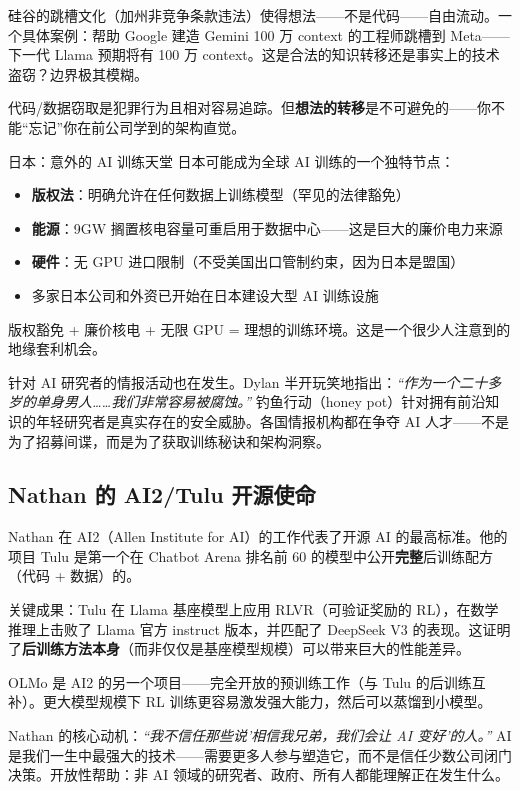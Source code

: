 \documentclass[a4paper]{article}
\begin{document}
硅谷的跳槽文化（加州非竞争条款违法）使得想法——不是代码——自由流动。一个具体案例：帮助 Google 建造 Gemini 100 万 context 的工程师跳槽到 Meta——下一代 Llama 预期将有 100 万 context。这是合法的知识转移还是事实上的技术盗窃？边界极其模糊。

代码/数据窃取是犯罪行为且相对容易追踪。但\textbf{想法的转移}是不可避免的——你不能``忘记''你在前公司学到的架构直觉。

\begin{knowledgebox}{日本：意外的 AI 训练天堂}
日本可能成为全球 AI 训练的一个独特节点：
\begin{itemize}
    \item \textbf{版权法}：明确允许在任何数据上训练模型（罕见的法律豁免）
    \item \textbf{能源}：9GW 搁置核电容量可重启用于数据中心——这是巨大的廉价电力来源
    \item \textbf{硬件}：无 GPU 进口限制（不受美国出口管制约束，因为日本是盟国）
    \item 多家日本公司和外资已开始在日本建设大型 AI 训练设施
\end{itemize}

版权豁免 + 廉价核电 + 无限 GPU = 理想的训练环境。这是一个很少人注意到的地缘套利机会。
\end{knowledgebox}

针对 AI 研究者的情报活动也在发生。Dylan 半开玩笑地指出：\textit{``作为一个二十多岁的单身男人……我们非常容易被腐蚀。''} 钓鱼行动（honey pot）针对拥有前沿知识的年轻研究者是真实存在的安全威胁。各国情报机构都在争夺 AI 人才——不是为了招募间谍，而是为了获取训练秘诀和架构洞察。

\subsection{Nathan 的 AI2/Tulu 开源使命}

Nathan 在 AI2（Allen Institute for AI）的工作代表了开源 AI 的最高标准。他的项目 Tulu 是第一个在 Chatbot Arena 排名前 60 的模型中公开\textbf{完整}后训练配方（代码 + 数据）的。

关键成果：Tulu 在 Llama 基座模型上应用 RLVR（可验证奖励的 RL），在数学推理上击败了 Llama 官方 instruct 版本，并匹配了 DeepSeek V3 的表现。这证明了\textbf{后训练方法本身}（而非仅仅是基座模型规模）可以带来巨大的性能差异。

OLMo 是 AI2 的另一个项目——完全开放的预训练工作（与 Tulu 的后训练互补）。更大模型规模下 RL 训练更容易激发强大能力，然后可以蒸馏到小模型。

Nathan 的核心动机：\textit{``我不信任那些说'相信我兄弟，我们会让 AI 变好'的人。''} AI 是我们一生中最强大的技术——需要更多人参与塑造它，而不是信任少数公司闭门决策。开放性帮助：非 AI 领域的研究者、政府、所有人都能理解正在发生什么。
\end{document}
